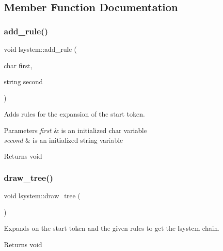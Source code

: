 \subsection{Member Function Documentation}
\mbox{\label{classlsystem_aa60f79a8eb02695cd94a9ba287c4bbda}} 
\subsubsection{\texorpdfstring{add\+\_\+rule()}{add\_rule()}}
{\footnotesize\ttfamily void lsystem\+::add\+\_\+rule (\begin{DoxyParamCaption}\item[{char}]{first,  }\item[{string}]{second }\end{DoxyParamCaption})}



Adds rules for the expansion of the start token. 


\begin{DoxyParams}{Parameters}
{\em first} & is an initialized char variable \\
\hline
{\em second} & is an initialized string variable \\
\hline
\end{DoxyParams}
\begin{DoxyReturn}{Returns}
void 
\end{DoxyReturn}
\mbox{\label{classlsystem_ac16fc720993e9fdb28bc9613a975fca9}} 
\subsubsection{\texorpdfstring{draw\+\_\+tree()}{draw\_tree()}}
{\footnotesize\ttfamily void lsystem\+::draw\+\_\+tree (\begin{DoxyParamCaption}{ }\end{DoxyParamCaption})}



Expands on the start token and the given rules to get the lsystem chain. 

\begin{DoxyReturn}{Returns}
void 
\end{DoxyReturn}
\mbox{\label{classlsystem_a50da66459afeaf0dccd74d7da22fc491}} 
